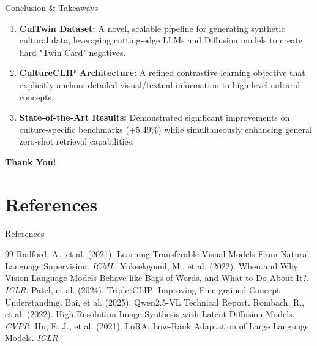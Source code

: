 \documentclass[aspectratio=169]{beamer}
\begin{document}
\begin{frame}{Conclusion \& Takeaways}
  
  \begin{enumerate}
    \setlength{\itemsep}{0.6cm}
    \item \textbf{CulTwin Dataset:} A novel, scalable pipeline for generating synthetic cultural data, leveraging cutting-edge LLMs and Diffusion models to create hard "Twin Card" negatives.
    \item \textbf{CultureCLIP Architecture:} A refined contrastive learning objective that explicitly anchors detailed visual/textual information to high-level cultural concepts.
    \item \textbf{State-of-the-Art Results:} Demonstrated significant improvements on culture-specific benchmarks (+5.49\%) while simultaneously enhancing general zero-shot retrieval capabilities.
  \end{enumerate}

  \vspace{0.8cm}
  \begin{center}
      \large \textbf{Thank You!}
  \end{center}
  
\end{frame}

\section{References}
\begin{frame}[allowframebreaks]{References}
  \scriptsize
  
  \begin{thebibliography}{99}
   Radford, A., et al. (2021). Learning Transferable Visual Models From Natural Language Supervision. \emph{ICML}.
   Yuksekgonul, M., et al. (2022). When and Why Vision-Language Models Behave like Bags-of-Words, and What to Do About It?. \emph{ICLR}.
   Patel, et al. (2024). TripletCLIP: Improving Fine-grained Concept Understanding.
   Bai, et al. (2025). Qwen2.5-VL Technical Report.
   Rombach, R., et al. (2022). High-Resolution Image Synthesis with Latent Diffusion Models. \emph{CVPR}.
   Hu, E. J., et al. (2021). LoRA: Low-Rank Adaptation of Large Language Models. \emph{ICLR}.
  \end{thebibliography}
\end{frame}
\end{document}
